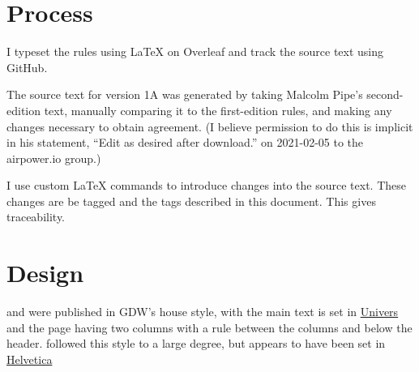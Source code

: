\documentclass[10pt]{report}
\begin{document}
% 

\section{Process}

I typeset the rules using LaTeX on Overleaf and track the source text using GitHub.

The source text for version 1A was generated by taking Malcolm Pipe’s second-edition text, manually comparing it to the first-edition rules, and making any changes necessary to obtain agreement. (I believe permission to do this is implicit in his statement, “Edit as desired after download.” on 2021-02-05 to the airpower.io group.)

I use custom LaTeX commands to introduce changes into the source text. These changes are be tagged and the tags described in this document. This gives traceability.

\section{Design}



{\AirSup} and {\AirStr} were published in GDW’s house style, with the main text is set in \href{https://en.wikipedia.org/wiki/Univers}{Univers} and the page having two columns with a rule between the columns and below the header. {\TSOH} followed this style to a large degree, but appears to have been set in \href{https://en.wikipedia.org/wiki/Helvetica}{Helvetica}
\end{document}
